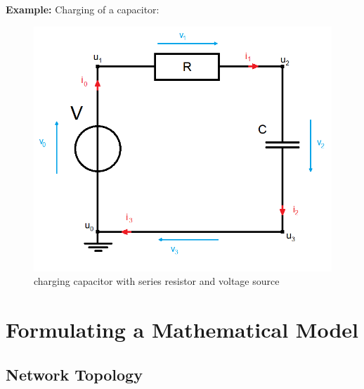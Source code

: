

\newcommand{\RomanNumeralCaps}[1]{\MakeUppercase{\romannumeral #1}}





	\begin{frame}
		\textbf{Example:} Charging of a capacitor:\\
		\begin{figure}[H]
			\centering
			\includegraphics[scale=0.4]{../Tex/pictures/Example1_simple.png}
			\caption{charging capacitor with series resistor and voltage source}
			\label{circuit:charging of capacitor}
		\end{figure}
	\end{frame}

\section*{Formulating a Mathematical Model}

	\subsection{Network Topology}
		
